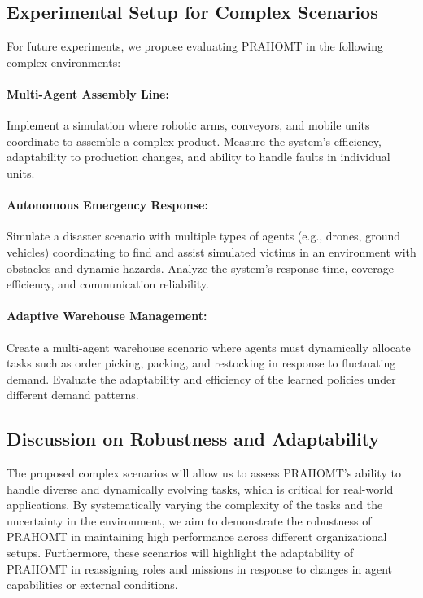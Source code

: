 \documentclass[sigconf,anonymous]{aamas}
\begin{document}
\subsection{Experimental Setup for Complex Scenarios}
For future experiments, we propose evaluating PRAHOMT in the following complex environments:

\paragraph{Multi-Agent Assembly Line:} Implement a simulation where robotic arms, conveyors, and mobile units coordinate to assemble a complex product. Measure the system's efficiency, adaptability to production changes, and ability to handle faults in individual units.

\paragraph{Autonomous Emergency Response:} Simulate a disaster scenario with multiple types of agents (e.g., drones, ground vehicles) coordinating to find and assist simulated victims in an environment with obstacles and dynamic hazards. Analyze the system's response time, coverage efficiency, and communication reliability.

\paragraph{Adaptive Warehouse Management:} Create a multi-agent warehouse scenario where agents must dynamically allocate tasks such as order picking, packing, and restocking in response to fluctuating demand. Evaluate the adaptability and efficiency of the learned policies under different demand patterns.

\subsection{Discussion on Robustness and Adaptability}
The proposed complex scenarios will allow us to assess PRAHOMT's ability to handle diverse and dynamically evolving tasks, which is critical for real-world applications. By systematically varying the complexity of the tasks and the uncertainty in the environment, we aim to demonstrate the robustness of PRAHOMT in maintaining high performance across different organizational setups. Furthermore, these scenarios will highlight the adaptability of PRAHOMT in reassigning roles and missions in response to changes in agent capabilities or external conditions.
\end{document}
